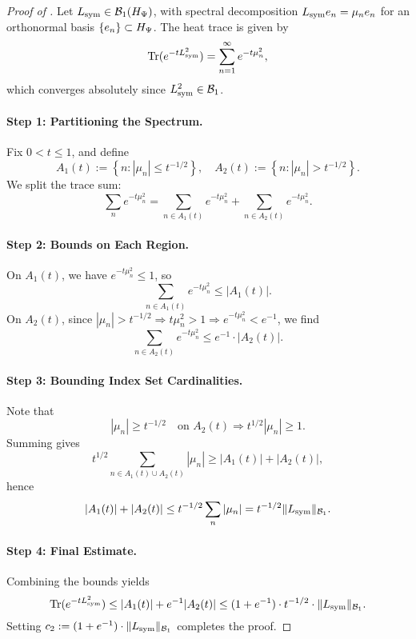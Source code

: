 \begin{proof}[Proof of ]
Let \( L_{\mathrm{sym}} \in \mathcal{B}_1(H_{\Psi}) \), with spectral decomposition \( L_{\mathrm{sym}} e_n = \mu_n e_n \) for an orthonormal basis \( \{ e_n \} \subset H_{\Psi} \). The heat trace is given by
\[
\operatorname{Tr}(e^{-t L_{\mathrm{sym}}^2}) = \sum_{n=1}^\infty e^{-t \mu_n^2},
\]
which converges absolutely since \( L_{\mathrm{sym}}^2 \in \mathcal{B}_1 \).

\paragraph{Step 1: Partitioning the Spectrum.}
Fix \( 0 < t \le 1 \), and define
\[
A_1(t) := \left\{ n : |\mu_n| \le t^{-1/2} \right\}, \quad
A_2(t) := \left\{ n : |\mu_n| > t^{-1/2} \right\}.
\]
We split the trace sum:
\[
\sum_n e^{-t \mu_n^2} = \sum_{n \in A_1(t)} e^{-t \mu_n^2} + \sum_{n \in A_2(t)} e^{-t \mu_n^2}.
\]

\paragraph{Step 2: Bounds on Each Region.}
On \( A_1(t) \), we have \( e^{-t \mu_n^2} \le 1 \), so
\[
\sum_{n \in A_1(t)} e^{-t \mu_n^2} \le |A_1(t)|.
\]
On \( A_2(t) \), since \( |\mu_n| > t^{-1/2} \Rightarrow t \mu_n^2 > 1 \Rightarrow e^{-t \mu_n^2} < e^{-1} \), we find
\[
\sum_{n \in A_2(t)} e^{-t \mu_n^2} \le e^{-1} \cdot |A_2(t)|.
\]

\paragraph{Step 3: Bounding Index Set Cardinalities.}
Note that
\[
|\mu_n| \ge t^{-1/2} \quad \text{on } A_2(t) \Rightarrow t^{1/2} |\mu_n| \ge 1.
\]
Summing gives
\[
t^{1/2} \sum_{n \in A_1(t) \cup A_2(t)} |\mu_n| \ge |A_1(t)| + |A_2(t)|,
\]
hence
\[
|A_1(t)| + |A_2(t)| \le t^{-1/2} \sum_n |\mu_n| = t^{-1/2} \|L_{\mathrm{sym}}\|_{\mathcal{B}_1}.
\]

\paragraph{Step 4: Final Estimate.}
Combining the bounds yields
\[
\operatorname{Tr}(e^{-t L_{\mathrm{sym}}^2})
\le |A_1(t)| + e^{-1} |A_2(t)|
\le (1 + e^{-1}) \cdot t^{-1/2} \cdot \|L_{\mathrm{sym}}\|_{\mathcal{B}_1}.
\]
Setting \( c_2 := (1 + e^{-1}) \cdot \|L_{\mathrm{sym}}\|_{\mathcal{B}_1} \) completes the proof.
\end{proof}
